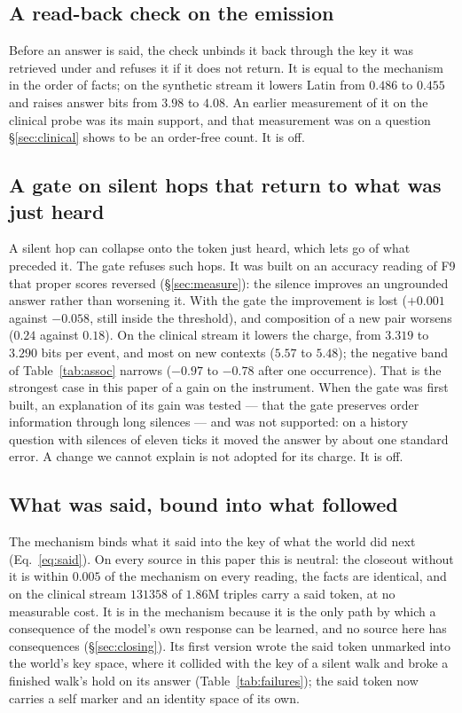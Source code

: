 \documentclass[11pt,a4paper]{article}
\theoremstyle{plain}
\theoremstyle{definition}
\theoremstyle{remark}
\begin{document}
\subsection{A read-back check on the emission}

Before an answer is said, the check unbinds it back through the key it was
retrieved under and refuses it if it does not return. It is equal to the
mechanism in the order of facts; on the synthetic stream it lowers Latin from
$0.486$ to $0.455$ and raises answer bits from $3.98$ to $4.08$. An earlier
measurement of it on the clinical probe was its main support, and that
measurement was on a question \S\ref{sec:clinical} shows to be an order-free
count. It is off.

\subsection{A gate on silent hops that return to what was just heard}

A silent hop can collapse onto the token just heard, which lets go of what
preceded it. The gate refuses such hops. It was built on an accuracy reading
of F9 that proper scores reversed (\S\ref{sec:measure}): the silence improves an
ungrounded answer rather than worsening it. With the gate the improvement is
lost ($+0.001$ against $-0.058$, still inside the threshold), and composition of
a new pair worsens ($0.24$ against $0.18$). On the clinical stream it lowers
the charge, from $3.319$ to $3.290$ bits per event, and most on new contexts
($5.57$ to $5.48$); the negative band of Table~\ref{tab:assoc} narrows ($-0.97$
to $-0.78$ after one occurrence). That is the strongest case in this paper of a
gain on the instrument. When the gate was first built, an explanation of its gain was tested --- that the gate preserves
order information through long silences --- and was not supported: on a
history question with silences of eleven ticks it moved the answer by about one
standard error. A change we cannot explain is not adopted for its charge. It is
off.

\subsection{What was said, bound into what followed}

The mechanism binds what it said into the key of what the world did next
(Eq.~\ref{eq:said}). On every source in this paper this is neutral: the
closeout without it is within $0.005$ of the mechanism on every reading, the
facts are identical, and on the clinical stream $131358$ of $1.86$M triples carry
a said token, at no measurable cost. It is in the mechanism because it is the
only path by which a consequence of the model's own response can be learned,
and no source here has consequences (\S\ref{sec:closing}). Its first version
wrote the said token unmarked into the world's key space, where it collided with
the key of a silent walk and broke a finished walk's hold on its answer
(Table~\ref{tab:failures}); the said token now carries a self marker and an
identity space of its own.
\end{document}
